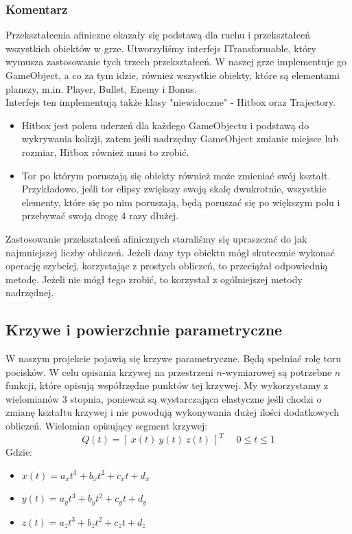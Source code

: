		\subsubsection{{\large Komentarz}}
			\indent \indent Przekształcenia afiniczne okazały się podstawą dla ruchu i przekształceń wszystkich obiektów w grze. Utworzyliśmy interfejs ITransformable, który wymusza zastosowanie tych trzech przekształceń. W naszej grze implementuje go GameObject, a co za tym idzie, również wszystkie obiekty, które są elementami planszy, m.in. Player, Bullet, Enemy i Bonus.\\
			\indent Interfejs ten implementują także klasy "niewidoczne" - Hitbox oraz Trajectory.
			\begin{itemize}
				\item Hitbox jest polem uderzeń dla każdego GameObjectu i podstawą do wykrywania kolizji, zatem jeśli nadrzędny GameObject zmianie miejsce lub rozmiar, Hitbox również musi to zrobić.
				\item Tor po którym poruszają się obiekty również może zmieniać swój kształt. Przykładowo, jeśli tor elipsy zwiększy swoją skalę dwukrotnie, wszystkie elementy, które się po nim poruszają, będą poruszać się po większym polu i przebywać swoją drogę 4 razy dłużej.
			\end{itemize}
			\indent Zastosowanie przekształceń afinicznych staraliśmy się upraszczać do jak najmniejszej liczby obliczeń. Jeżeli dany typ obiektu mógł skutecznie wykonać operację szybciej, korzystając z prostych obliczeń, to przeciążał odpowiednią metodę. Jeżeli nie mógł tego zrobić, to korzystał z ogólniejszej metody nadrzędnej.
\newpage
\subsection{Krzywe i powierzchnie parametryczne}
	\indent \indent W naszym projekcie pojawią się krzywe parametryczne. Będą spełniać rolę toru pocisków. W celu opisania krzywej na przestrzeni $ n $-wymiarowej są potrzebne $ n $ funkcji, które opisują współrzędne punktów tej krzywej. My wykorzystamy z wielomianów 3 stopnia, ponieważ są wystarczająca elastyczne jeśli chodzi o zmianę kształtu krzywej i nie powodują wykonywania dużej ilości dodatkowych obliczeń.
	Wielomian opisujący segment krzywej:
	$$ Q(t)=[\:x(t)\:y(t)\:z(t)\:]^T  \:\:\:\:\:\: 0 \leq t \leq 1 $$
	Gdzie:
	\begin{itemize}
		\item $ x(t)= a_x t^3+b_x t^2+c_x t+d_x $
		\item $ y(t)= a_y t^3+b_y t^2+c_y t+d_y $
		\item $ z(t)= a_z t^3+b_z t^2+c_z t+d_z $
	\end{itemize}
	

